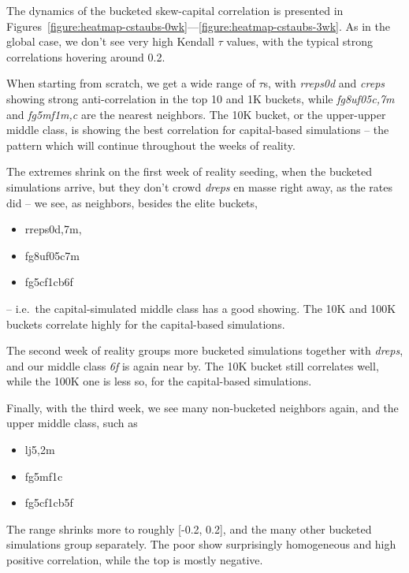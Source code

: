 \documentclass[10pt,oneside]{memoir}
\begin{document}
\begin{Spacing}{2}
The dynamics of the bucketed skew-capital correlation is presented in Figures~\ref{figure:heatmap-cstaubs-0wk}---\ref{figure:heatmap-cstaubs-3wk}.  As in the global case, we don't see very high Kendall $\tau$ values, with the typical strong correlations hovering around 0.2.  


When starting from scratch, we get a wide range of $\tau$s, with {\itshape rreps0d} and {\itshape creps} showing strong anti-correlation in the top 10 and 1K buckets, while {\itshape fg8uf05c{,7m}} and {\itshape fg5mf1{m,c}} are the nearest neighbors.  The 10K bucket, or the upper-upper middle class, is showing the best correlation for capital-based simulations -- the pattern which will continue throughout the weeks of reality.


The extremes shrink on the first week of reality seeding, when the bucketed simulations arrive, but they don't crowd {\itshape dreps} en masse right away, as the rates did -- we see, as neighbors, besides the elite buckets, 


\begin{itemize}


\item rreps{0d,7m,}

\item fg8uf05c7m

\item fg5cf1cb6f
\end{itemize}

-- i.e.\ the capital-simulated middle class has a good showing.  The 10K and 100K buckets correlate highly for the capital-based simulations.


The second week of reality groups more bucketed simulations together with {\itshape dreps}, and our middle class {\itshape 6f} is again near by.  The 10K bucket still correlates well, while the 100K one is less so, for the capital-based simulations.


Finally, with the third week, we see many non-bucketed neighbors again, and the upper middle class, such as 


\begin{itemize}


\item lj{5,2}m

\item fg5mf1c

\item fg5cf1cb5f
\end{itemize}

The range shrinks more to roughly [-0.2, 0.2], and the many other bucketed simulations group separately.  The poor show surprisingly homogeneous and high positive correlation, while the top is mostly negative.




\end{Spacing}
\end{document}
